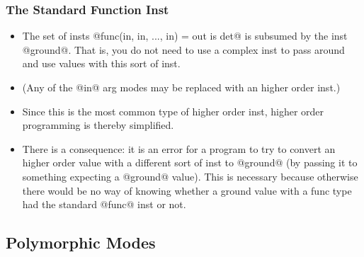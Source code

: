 \subsubsection{The Standard Function Inst}


\begin{itemize}
\item The set of insts @func(in, in, ..., in) = out is det@ is
  subsumed by the inst @ground@.  That is, you do not need to
  use a complex inst to pass around and use values with this
  sort of inst.
\item (Any of the @in@ arg modes may be replaced with an higher
  order inst.)
\item Since this is the most common type of higher order inst,
  higher order programming is thereby simplified.
\item There is a consequence: it is an error for a program to try
  to convert an higher order value with a different sort of
  inst to @ground@ (\eg by passing it to something expecting a
  @ground@ value).  This is necessary because otherwise there
  would be no way of knowing whether a ground value with a
  func type had the standard @func@ inst or not.
\end{itemize}

\subsection{Polymorphic Modes}




